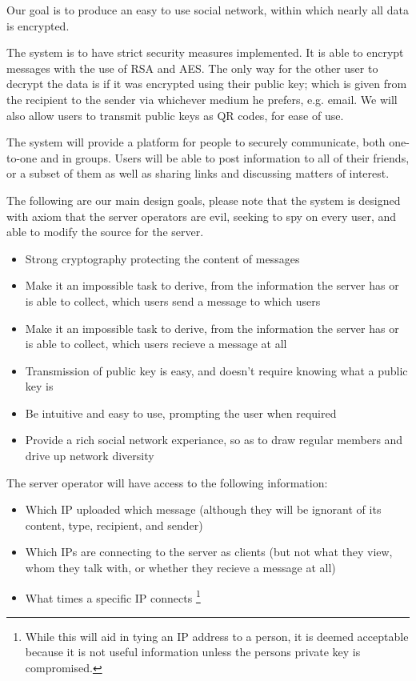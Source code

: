 Our goal is to produce an easy to use social network, within which nearly all
data is encrypted.

The system is to have strict security measures implemented. It is able to
encrypt messages with the use of RSA and AES. The only way for the other user to
decrypt the data is if it was encrypted using their public key; which is given
from the recipient to the sender via whichever medium he prefers, e.g. email.
We will also allow users to transmit public keys as QR codes, for ease of use.

The system will provide a platform for people to securely communicate, both
one-to-one and in groups. Users will be able to post information to all of their
friends, or a subset of them as well as sharing links and discussing matters of
interest.

The following are our main design goals, please note that the system is designed
with axiom that the server operators are evil, seeking to spy on every user, and
able to modify the source for the server.
\begin{itemize}
\item Strong cryptography protecting the content of messages
\item Make it an impossible task to derive, from the information the server has
      or is able to collect, which users send a message to which users
\item Make it an impossible task to derive, from the information the server has
      or is able to collect, which users recieve a message at all
\item Transmission of public key is easy, and doesn't require knowing what a
      public key is
\item Be intuitive and easy to use, prompting the user when required
\item Provide a rich social network experiance, so as to draw regular members
      and drive up network diversity
\end{itemize}

The server operator will have access to the following information:
\begin{itemize}
\item Which IP uploaded which message (although they will be ignorant of its
content, type, recipient, and sender)
\item Which IPs are connecting to the server as clients (but not what they view,
whom they talk with, or whether they recieve a message at all)
\item What times a specific IP connects \footnote {While this will aid in tying
an IP address to a person, it is deemed acceptable because it is not useful
information unless the persons private key is compromised.}
\end{itemize}


